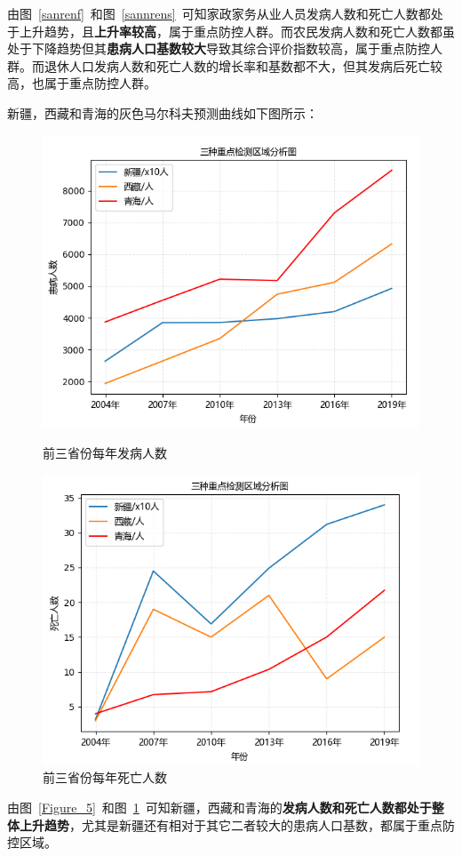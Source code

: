 \documentclass{whutmod}
\begin{document}
由图~\ref{sanrenf}~和图~\ref{sannrens}~可知家政家务从业人员发病人数和死亡人数都处于上升趋势，且\textbf{上升率较高}，属于重点防控人群。而农民发病人数和死亡人数都虽处于下降趋势但其\textbf{患病人口基数较大}导致其综合评价指数较高，属于重点防控人群。而退休人口发病人数和死亡人数的增长率和基数都不大，但其发病后死亡较高，也属于重点防控人群。

新疆，西藏和青海的灰色马尔科夫预测曲线如下图所示：
	\begin{figure}[H]
	\begin{minipage}[t]{0.5\linewidth}
		\centering
		\includegraphics[width=\textwidth]{figures/Figure_5.png}
		\caption{前三省份每年发病人数}\label{Figure_5}
	\end{minipage}
	\hfill%
	\begin{minipage}[t]{0.5\linewidth}
		\centering
		\includegraphics[width=\textwidth]{figures/Figure_1.png}
		\caption{前三省份每年死亡人数}\label{Figure_6}
	\end{minipage}
\end{figure}
由图~\ref{Figure_5}~和图~\ref{Figure_6}~可知新疆，西藏和青海的\textbf{发病人数和死亡人数都处于整体上升趋势}，尤其是新疆还有相对于其它二者较大的患病人口基数，都属于重点防控区域。
\end{document}
